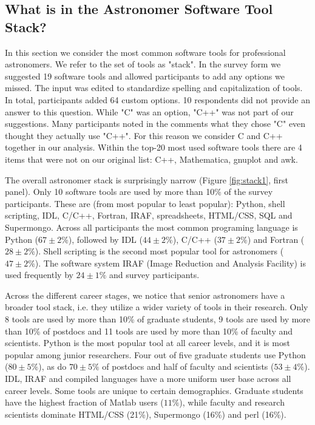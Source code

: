 
\subsection{What is in the Astronomer Software Tool Stack?}

In this section we consider the most common software tools for professional astronomers. We refer to the set of tools as "stack". In the survey form we suggested 19 software tools and allowed participants to add any options we missed. The input was edited to standardize spelling and capitalization of tools. In total, participants added 64 custom options. 10 respondents did not provide an answer to this question. While "C" was an option, "C++" was not part of our suggestions. Many participants noted in the comments what they chose "C" even thought they actually use "C++". For this reason we consider C and C++ together in our analysis. Within the top-20 most used software tools there are 4 items that were not on our original list: C++, Mathematica, gnuplot and awk.

The overall astronomer stack is surprisingly narrow (Figure \ref{fig:stack1}, first panel). Only 10 software tools are used by more than 10\% of the survey participants. These are (from most popular to least popular): Python, shell scripting, IDL, C/C++, Fortran, IRAF, spreadsheets, HTML/CSS, SQL and Supermongo. Across all participants the most common programing language is Python ($67\pm2\%$), followed by IDL ($44\pm2\%$), C/C++ ($37\pm2\%$) and Fortran ($28\pm2\%$). Shell scripting is the second most popular tool for astronomers ($47\pm2\%$). The software system IRAF (Image Reduction and Analysis Facility) is used frequently by $24\pm1\%$ and survey participants. 

Across the different career stages, we notice that senior astronomers have a broader tool stack, i.e. they utilize a wider variety of tools in their research. Only 8 tools are used by more than 10\% of graduate students, 9 tools are used by more than 10\% of postdocs and 11 tools are used by more than 10\% of faculty and scientists. Python is the most popular tool at all career levels, and it is most popular among junior researchers. Four out of five graduate students use Python ($80\pm5\%$), as do $70\pm5\%$ of postdocs and half of faculty and scientists ($53\pm4\%$). IDL, IRAF and compiled languages have a more uniform user base across all career levels. Some tools are unique to certain demographics. Graduate students have the highest fraction of Matlab users ($11\%$), while faculty and research scientists dominate HTML/CSS (21\%), Supermongo (16\%) and perl (16\%).

